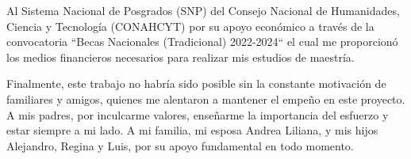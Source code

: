\vspace{0.5cm}

Al Sistema Nacional de Posgrados (SNP) del Consejo Nacional de Humanidades, Ciencia y Tecnología (CONAHCYT) por su apoyo económico a través de la convocatoria ``Becas Nacionales (Tradicional) 2022-2024`` el cual me proporcionó los medios financieros necesarios para realizar mis estudios de maestría.

\vspace{0.5cm}

Finalmente, este trabajo no habría sido posible sin la constante motivación de familiares y amigos, quienes me alentaron a mantener el empeño en este proyecto. A mis padres, por inculcarme valores, enseñarme la importancia del esfuerzo y estar siempre a mi lado. A mi familia, mi esposa Andrea Liliana, y mis hijos Alejandro, Regina y Luis, por su apoyo fundamental en todo momento.